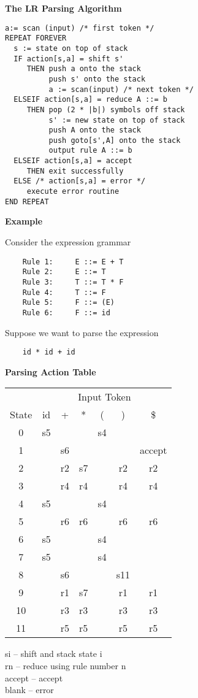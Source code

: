 %
%
\begin{slide}{}
{\small
{\bf The LR Parsing Algorithm}
\begin{verbatim}
a:= scan (input) /* first token */
REPEAT FOREVER
  s := state on top of stack
  IF action[s,a] = shift s'
     THEN push a onto the stack
          push s' onto the stack
          a := scan(input) /* next token */
  ELSEIF action[s,a] = reduce A ::= b
     THEN pop (2 * |b|) symbols off stack
          s' := new state on top of stack
          push A onto the stack
          push goto[s',A] onto the stack
          output rule A ::= b
  ELSEIF action[s,a] = accept
     THEN exit successfully
  ELSE /* action[s,a] = error */
     execute error routine
END REPEAT
\end{verbatim}
}
\end{slide}
%
%
\begin{slide}{}
{\bf Example}

Consider the expression grammar
\begin{verbatim}
    Rule 1:     E ::= E + T
    Rule 2:     E ::= T
    Rule 3:     T ::= T * F
    Rule 4:     T ::= F
    Rule 5:     F ::= (E)
    Rule 6:     F ::= id
\end{verbatim}

Suppose we want to parse the expression
\begin{verbatim}
    id * id + id
\end{verbatim}
\end{slide}
%
%
\begin{slide}{}
{\bf Parsing Action Table}\\[0.5cm]               

\begin{tabular}{|c|c|c|c|c|c|c|}
\hline
      & \multicolumn{6}{|c|}{Input Token}\\
State & id & +  & *  & (  & )  & \$ \\
\hline
0     & s5 &    &    & s4 &    &    \\
1     &    & s6 &    &    &    & accept \\
2     &    & r2 & s7 &    & r2 & r2 \\
3     &    & r4 & r4 &    & r4 & r4 \\
4     & s5 &    &    & s4 &    &    \\
5     &    & r6 & r6 &    & r6 & r6 \\
6     & s5 &    &    & s4 &    &    \\
7     & s5 &    &    & s4 &    &    \\
8     &    & s6 &    &    & s11 &   \\
9     &    & r1 & s7 &    & r1 & r1 \\
10    &    & r3 & r3 &    & r3 & r3 \\
11    &    & r5 & r5 &    & r5 & r5 \\
\hline
\end{tabular}

si -- shift and stack state i \\
rn -- reduce using rule number n \\
accept -- accept \\
blank -- error
\end{slide}
